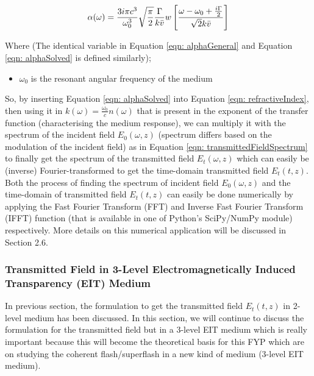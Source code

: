 \begin{equation}
    \alpha(\omega) = \frac{3i\pi c^{3}}{\omega_{0}^{3}} \sqrt{\frac{\pi}{2}} \frac{\Gamma}{k\Bar{v}} w\left[\frac{\omega - \omega_{0} + \frac{i\Gamma}{2}}{\sqrt{2}k\Bar{v}}\right]
    \label{eqn: alphaSolved}
\end{equation}

Where (The identical variable in Equation \ref{eqn: alphaGeneral} and Equation \ref{eqn: alphaSolved} is defined similarly);

\begin{itemize}
    \item $\omega_{0}$ is the resonant angular frequency of the medium
\end{itemize}

So, by inserting Equation \ref{eqn: alphaSolved} into Equation \ref{eqn: refractiveIndex}, then using it in $k(\omega) = \frac{\omega_{0}}{c} n(\omega)$ that is present in the exponent of the transfer function (characterising the medium response), we can multiply it with the spectrum of the incident field $E_{0}(\omega, z)$ (spectrum differs based on the modulation of the incident field) as in Equation \ref{eqn: transmittedFieldSpectrum} to finally get the spectrum of the transmitted field $E_{t}(\omega, z)$ which can easily be (inverse) Fourier-transformed to get the time-domain transmitted field $E_{t}(t, z)$. Both the process of finding the spectrum of incident field $E_{0}(\omega, z)$ and the time-domain of transmitted field $E_{t}(t, z)$ can easily be done numerically by applying the Fast Fourier Transform (FFT) and Inverse Fast Fourier Transform (IFFT) function (that is available in one of Python's SciPy/NumPy module) respectively. More details on this numerical application will be discussed in Section 2.6.

\subsubsection{Transmitted Field in 3-Level Electromagnetically Induced Transparency (EIT) Medium}
In previous section, the formulation to get the transmitted field $E_{t}(t, z)$ in 2-level medium has been discussed. In this section, we will continue to discuss the formulation for the transmitted field but in a 3-level EIT medium which is really important because this will become the theoretical basis for this FYP which are on studying the coherent flash/superflash in a new kind of medium (3-level EIT medium).\\


